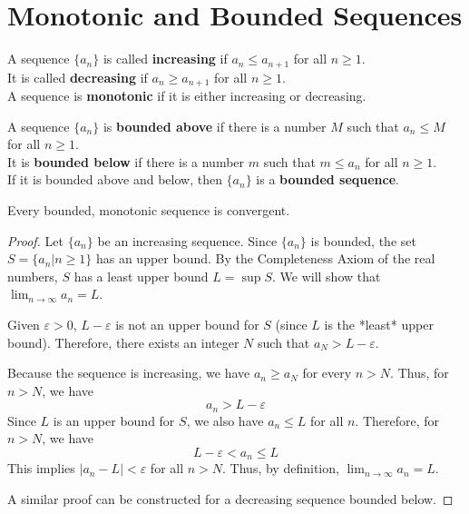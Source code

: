 \documentclass{article}
\theoremstyle{mystyle}
\begin{document}
\section*{Monotonic and Bounded Sequences}
\begin{tcolorbox}[colback=white, colframe=orange!80!white, title=Definitions, boxrule=0.5mm, arc=3mm]
A sequence \(\{a_n\}\) is called \textbf{increasing} if \(a_n \le a_{n+1}\) for all \(n \ge 1\). \\
It is called \textbf{decreasing} if \(a_n \ge a_{n+1}\) for all \(n \ge 1\). \\
A sequence is \textbf{monotonic} if it is either increasing or decreasing.
\end{tcolorbox}

\begin{tcolorbox}[colback=white, colframe=orange!80!white, title=Definitions, boxrule=0.5mm, arc=3mm]
A sequence \(\{a_n\}\) is \textbf{bounded above} if there is a number \(M\) such that \(a_n \le M\) for all \(n \ge 1\). \\
It is \textbf{bounded below} if there is a number \(m\) such that \(m \le a_n\) for all \(n \ge 1\). \\
If it is bounded above and below, then \(\{a_n\}\) is a \textbf{bounded sequence}.
\end{tcolorbox}

\begin{tcolorbox}[colback=white, colframe=orange!80!white, title=Monotonic Sequence Theorem (Theorem 6), boxrule=0.5mm, arc=3mm]
Every bounded, monotonic sequence is convergent.
\end{tcolorbox}
\begin{proof}
Let \(\{a_n\}\) be an increasing sequence. Since \(\{a_n\}\) is bounded, the set \(S = \{a_n | n \ge 1\}\) has an upper bound. By the Completeness Axiom of the real numbers, \(S\) has a least upper bound \(L = \sup S\). We will show that \(\lim_{n\to\infty} a_n = L\).

Given \(\varepsilon > 0\), \(L-\varepsilon\) is not an upper bound for \(S\) (since \(L\) is the *least* upper bound). Therefore, there exists an integer \(N\) such that \(a_N > L - \varepsilon\).

Because the sequence is increasing, we have \(a_n \ge a_N\) for every \(n > N\). Thus, for \(n > N\), we have
\[ a_n > L - \varepsilon \]
Since \(L\) is an upper bound for \(S\), we also have \(a_n \le L\) for all \(n\). Therefore, for \(n > N\), we have
\[ L - \varepsilon < a_n \le L \]
This implies \(|a_n - L| < \varepsilon\) for all \(n > N\). Thus, by definition, \(\lim_{n\to\infty} a_n = L\).

A similar proof can be constructed for a decreasing sequence bounded below.
\end{proof}
\end{document}
